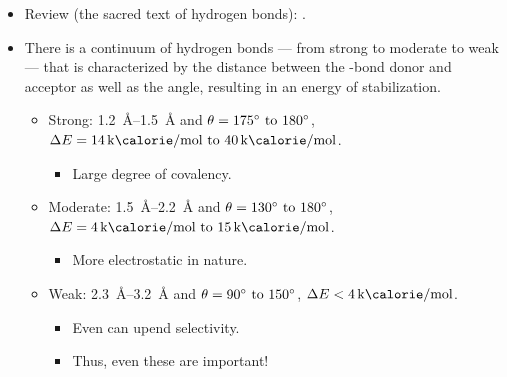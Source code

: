 \documentclass[../notes.tex]{subfiles}
\begin{document}
\begin{itemize}
\begin{itemize}
\begin{itemize}
        \end{itemize}
        \item Review (the sacred text of hydrogen bonds): \textcite{bib:Hbond}.
        \item There is a continuum of hydrogen bonds --- from strong to moderate to weak --- that is characterized by the distance between the -bond donor and acceptor as well as the angle, resulting in an energy of stabilization.
        \begin{itemize}
            \item Strong: \SIrange{1.2}{1.5}{\angstrom} and $\theta=\angrange{175}{180}$, $\Delta E=\kcalr{14}{40}$.
            \begin{itemize}
                \item Large degree of covalency.
            \end{itemize}
            \item Moderate: \SIrange{1.5}{2.2}{\angstrom} and $\theta=\angrange{130}{180}$, $\Delta E=\kcalr{4}{15}$.
            \begin{itemize}
                \item More electrostatic in nature.
            \end{itemize}
            \item Weak: \SIrange{2.3}{3.2}{\angstrom} and $\theta=\angrange{90}{150}$, $\Delta E<\kcal{4}$.
            \begin{itemize}
                \item Even  can upend selectivity.
                \item Thus, even these are important!
            \end{itemize}
        \end{itemize}
    \end{itemize}
\end{itemize}
\end{document}
